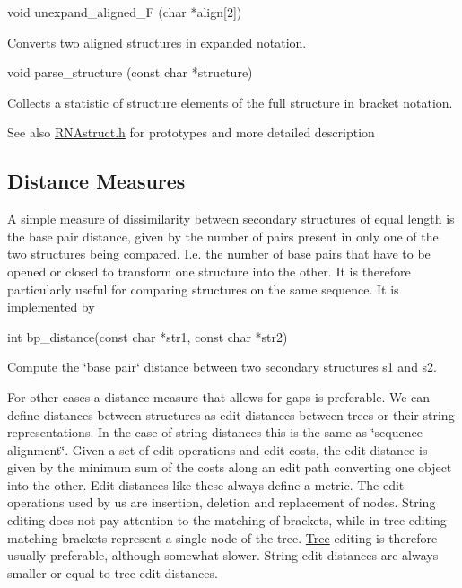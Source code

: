 \begin{DoxyVerb}void   unexpand_aligned_F (char *align[2])
\end{DoxyVerb}
 Converts two aligned structures in expanded notation.

\begin{DoxyVerb}void   parse_structure (const char *structure)
\end{DoxyVerb}
 Collects a statistic of structure elements of the full structure in bracket notation.

\begin{DoxySeeAlso}{See also}
\mbox{\hyperlink{RNAstruct_8h}{R\+N\+Astruct.\+h}} for prototypes and more detailed description
\end{DoxySeeAlso}
\subsection*{Distance Measures}

A simple measure of dissimilarity between secondary structures of equal length is the base pair distance, given by the number of pairs present in only one of the two structures being compared. I.\+e. the number of base pairs that have to be opened or closed to transform one structure into the other. It is therefore particularly useful for comparing structures on the same sequence. It is implemented by

\begin{DoxyVerb}int bp_distance(const char *str1,
                const char *str2)
\end{DoxyVerb}
 Compute the \char`\"{}base pair\char`\"{} distance between two secondary structures s1 and s2.

For other cases a distance measure that allows for gaps is preferable. We can define distances between structures as edit distances between trees or their string representations. In the case of string distances this is the same as \char`\"{}sequence alignment\char`\"{}. Given a set of edit operations and edit costs, the edit distance is given by the minimum sum of the costs along an edit path converting one object into the other. Edit distances like these always define a metric. The edit operations used by us are insertion, deletion and replacement of nodes. String editing does not pay attention to the matching of brackets, while in tree editing matching brackets represent a single node of the tree. \mbox{\hyperlink{structTree}{Tree}} editing is therefore usually preferable, although somewhat slower. String edit distances are always smaller or equal to tree edit distances.


